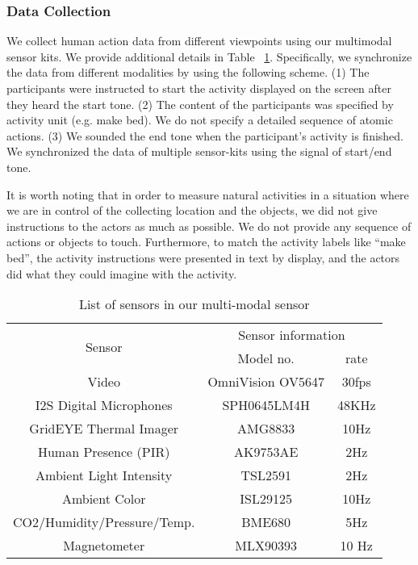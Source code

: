 \documentclass[final]{cvpr}
\begin{document}
\subsubsection*{Data Collection}

We collect human action data from different viewpoints using our multimodal sensor kits. We provide additional details in Table ~\ref{table:sensors}. Specifically, we synchronize the data from different modalities by using the following scheme. 
(1) The participants were instructed to start the activity displayed on the screen after they heard the start tone.
(2) The content of the participants was specified by activity unit (e.g. make bed). We do not specify a detailed sequence of atomic actions.
(3) We sounded the end tone when the participant's activity is finished. We synchronized the data of multiple sensor-kits using the signal of start/end tone.

It is worth noting that in order to measure natural activities in a situation where we are in control of the collecting location and the objects, we did not give instructions to the actors as much as possible. We do not provide any sequence of actions or objects to touch. Furthermore, to match the activity labels like ``make bed'', the activity instructions were presented in text by display, and the actors did what they could imagine with the activity.

\begin{table}[t]
\centering
\renewcommand{\arraystretch}{1.0}
\renewcommand{\tabcolsep}{2mm}
\footnotesize
\caption{List of sensors in our multi-modal sensor}
\vspace{-10pt}
\label{table:sensors}
\begin{tabular}{c|c|c}
    \toprule
    \multirow{2}{*}{Sensor} & \multicolumn{2}{c}{Sensor information}\\
    & \multicolumn{1}{c|}{Model no.} & rate\\
    \midrule
    Video & OmniVision OV5647 & 30fps \\
    I2S Digital Microphones & SPH0645LM4H & 48KHz \\
    GridEYE Thermal Imager & AMG8833 & 10Hz \\
    Human Presence (PIR) & AK9753AE & 2Hz \\
    Ambient Light Intensity & TSL2591 & 2Hz \\
    Ambient Color & ISL29125 & 10Hz \\
    CO2/Humidity/Pressure/Temp. & BME680 & 5Hz \\
    Magnetometer & MLX90393 & 10 Hz \\
    \bottomrule
\end{tabular}
\normalsize

\end{table}
\end{document}

